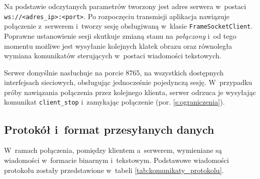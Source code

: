 Na podstawie odczytanych parametrów tworzony jest adres serwera w~postaci \texttt{ws://<adres\_ip>:<port>}. Po rozpoczęciu transmisji aplikacja nawiązuje połączenie z~serwerem i~tworzy sesję obsługiwaną w~klasie \texttt{FrameSocketClient}. Poprawne ustanowienie sesji skutkuje zmianą stanu na \textit{połączony} i~od tego momentu możliwe jest wysyłanie kolejnych klatek obrazu oraz równoległa wymiana komunikatów sterujących w~postaci wiadomości tekstowych.

Serwer domyślnie nasłuchuje na porcie 8765, na wszystkich dostępnych interfejsach sieciowych, obsługując jednocześnie pojedynczą sesję. W~przypadku próby nawiązania połączenia przez kolejnego klienta, serwer odrzuca je wysyłając komunikat \texttt{client\_stop} i~zamykając połączenie (por. \ref{s:ograniczenia}).

\subsection{Protokół i~format przesyłanych danych}

W~ramach połączenia, pomiędzy klientem a~serwerem, wymieniane są wiadomości w~formacie binarnym i~tekstowym. Podstawowe wiadomości protokołu zostały przedstawione w~tabeli \ref{tab:komunikaty_protokolu}.

